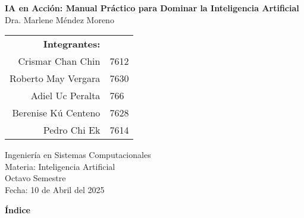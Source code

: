 \documentclass[12pt]{article}
\begin{document}
\vspace*{2cm}

\begin{center}
    \Huge\textbf{IA en Acción: Manual Práctico para Dominar la Inteligencia Artificial}\\[1.5cm]
    \large Dra. Marlene Méndez Moreno\\[5cm]
\end{center}


\vfill


\begin{flushright}
\begin{tabular}{rl}
\textbf{Integrantes:} & \\[0.3cm]
Crismar Chan Chin & 7612 \\
Roberto May Vergara & 7630 \\
Adiel Uc Peralta & 766 \\
Berenise K\'u Centeno & 7628\\
Pedro Chi Ek & 7614 \\
\end{tabular}
\end{flushright}

\vspace{1cm}

\begin{center}
Ingeniería en Sistemas Computacionales\\
Materia: Inteligencia Artificial\\
Octavo  Semestre\\
Fecha: 10 de Abril del 2025
\end{center}

\newpage


\begin{center}
    \Huge \textbf{Índice}
\end{center}
\vspace{1cm}
\end{document}
